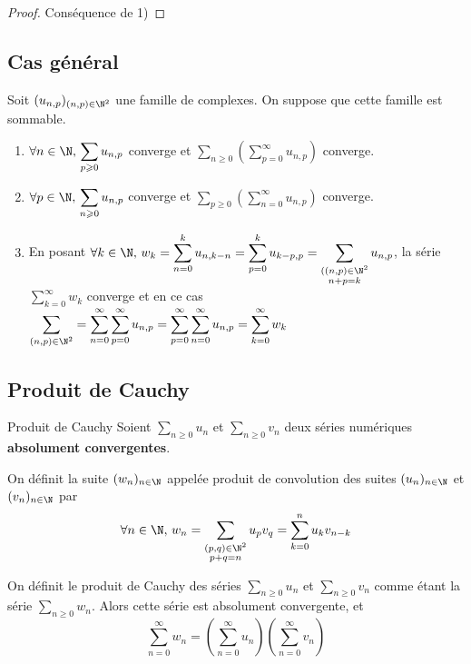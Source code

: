 \begin{proof}
    Conséquence de 1)
\end{proof}

\subsection{Cas général}

\begin{theoreme}{}{}
    Soit $(u_{n, p})_{(n, p) \in \N^2}$ une famille de complexes. On suppose que 
    cette famille est sommable.

    \begin{enumerate}
        \item $\displaystyle \forall n \in \N, \, \sum_{p \geqslant 0 } u_{n, p}$ converge et $\displaystyle \sum_{n \geqslant 0} \left( \sum_{p = 0}^\infty u_{n, p} \right)$ converge.
        \item $\forall p \in \N, \, \displaystyle \sum_{n \geqslant 0 } u_{n, p}$ converge et $\displaystyle \sum_{p \geqslant 0} \left( \sum_{n = 0}^\infty u_{n, p} \right)$ converge.
        \item En posant $\forall k \in \N, \, w_k = \displaystyle \sum_{n = 0 }^{k }u_{n, k - n} = \sum_{p = 0 }^{k } u_{k - p, p} = \sum_{\substack{((n, p) \in \N^2 \\ n + p = k}} u_{n, p}$, la série $\displaystyle \sum_{k = 0}^\infty w_k$ converge
            et en ce cas $\displaystyle \sum_{(n, p) \in \N^2} = \sum_{n = 0 }^{\infty } \sum_{p = 0 }^{\infty }u_{n, p} = \sum_{p = 0 }^{\infty } \sum_{n = 0 }^{\infty }u_{n, p} = \sum_{k = 0 }^{\infty } w_k$ 
    \end{enumerate}
\end{theoreme}

\subsection{Produit de Cauchy }

\begin{theoreme}{Produit de Cauchy}{}
    Soient $ \sum_{n \geqslant 0} u_n$ et $ \sum_{n \geqslant 0} v_n$ deux séries 
    numériques \textbf{absolument convergentes}.
    
    On définit la suite $(w_n)_{n \in \N}$ appelée produit de convolution des suites 
    $(u_n)_{n \in \N}$ et $(v_n)_{n \in \N}$ par
    $$\forall n \in \N, \, w_n = \sum_{\substack{(p, q) \in \N^2 \\ p + q = n}} u_p v_q = \sum_{k = 0}^n u_k v_{n - k}$$

    On définit le produit de Cauchy des séries $ \sum_{n \geqslant 0} u_n$ et $ \sum_{n \geqslant 0} v_n$ 
    comme étant la série $ \sum_{n \geqslant 0} w_n$. Alors cette série est
    absolument convergente, et $$\sum_{n = 0 }^{\infty} w_n = \left( \sum_{n = 0 }^{\infty } u_n \right) \left( \sum_{n = 0 }^{\infty } v_n \right)$$
\end{theoreme}

